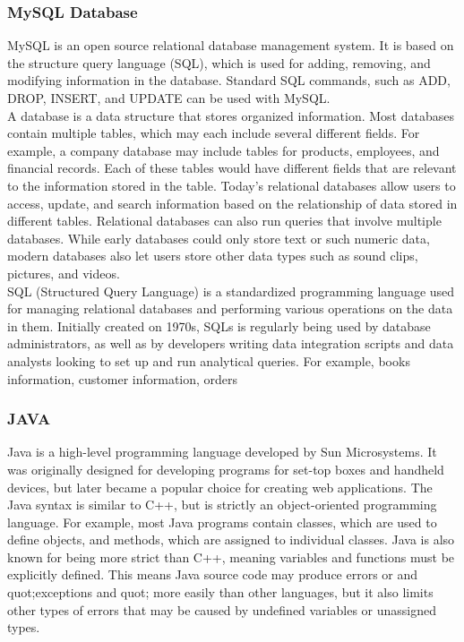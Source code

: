 \documentclass[12pt,a4paper]{article}
\newcommand\tab[1][1cm]{\hspace*{#1}}
\begin{document}
	\subsubsection{MySQL Database}
	\tab MySQL\cite{Ref:5} is an open source relational database management system. It is based on the
structure query language (SQL), which is used for adding, removing, and modifying
information in the database. Standard SQL commands, such as ADD, DROP, INSERT,
and UPDATE can be used with MySQL.\\

\tab A database is a data structure that stores organized information. Most databases
contain multiple tables, which may each include several different fields. For example, a
company database may include tables for products, employees, and financial records. Each
of these tables would have different fields that are relevant to the information stored in the
table. Today’s relational databases allow users to access, update, and search information
based on the relationship of data stored in different tables. Relational databases can also
run queries that involve multiple databases. While early databases could only store text or
such numeric data, modern databases also let users store other data types such as sound
clips, pictures, and videos.\\

\tab SQL (Structured Query Language) is a standardized programming language used for
managing relational databases and performing various operations on the data in them.
Initially created on 1970s, SQLs is regularly being used by database administrators, as well
as by developers writing data integration scripts and data analysts looking to set up and run
analytical queries. For example, books information, customer information, orders

\subsubsection{JAVA}
	\tab Java\cite{Ref:7} is a high-level programming language developed by Sun Microsystems. It was
originally designed for developing programs for set-top boxes and handheld devices, but
later became a popular choice for creating web applications.
The Java syntax is similar to C++, but is strictly an object-oriented programming
language. For example, most Java programs contain classes, which are used to define
objects, and methods, which are assigned to individual classes. Java is also known for
being more strict than C++, meaning variables and functions must be explicitly defined.
This means Java source code may produce errors or  and quot;exceptions and quot; more easily than other
languages, but it also limits other types of errors that may be caused by undefined variables
or unassigned types.\\
\end{document}
